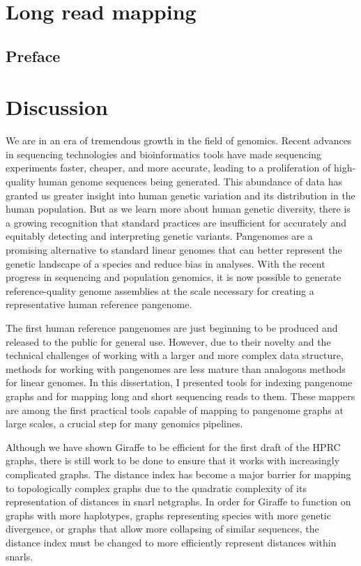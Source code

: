 \documentclass[11pt]{ucscthesis}
\begin{document}
\chapter{Long read mapping}
\label{chapter:lr-giraffe}
\section{Preface}

\chapter{Discussion}

We are in an era of tremendous growth in the field of genomics.
Recent advances in sequencing technologies and bioinformatics tools have made sequencing experiments faster, cheaper, and more accurate, leading to a proliferation of high-quality human genome sequences being generated.
This abundance of data has granted us greater insight into human genetic variation and its distribution in the human population.
But as we learn more about human genetic diversity, there is a growing recognition that standard practices are insufficient for accurately and equitably detecting and interpreting genetic variants. 
Pangenomes are a promising alternative to standard linear genomes that can better represent the genetic landscape of a species and reduce bias in analyses.
With the recent progress in sequencing and population genomics, it is now possible to generate reference-quality genome assemblies at the scale necessary for creating a representative human reference pangenome.

The first human reference pangenomes are just beginning to be produced and released to the public for general use.
However, due to their novelty and the technical challenges of working with a larger and more complex data structure, methods for working with pangenomes are less mature than analogous methods for linear genomes.
In this dissertation, I presented tools for indexing pangenome graphs and for mapping long and short sequencing reads to them.
These mappers are among the first practical tools capable of mapping to pangenome graphs at large scales, a crucial step for many genomics pipelines.

Although we have shown Giraffe to be efficient for the first draft of the HPRC graphs, there is still work to be done to ensure that it works with increasingly complicated graphs.
The distance index has become a major barrier for mapping to topologically complex graphs due to the quadratic complexity of its representation of distances in snarl netgraphs.
In order for Giraffe to function on graphs with more haplotypes, graphs representing species with more genetic divergence, or graphs that allow more collapsing of similar sequences, the distance index must be changed to more efficiently represent distances within snarls.
\end{document}
